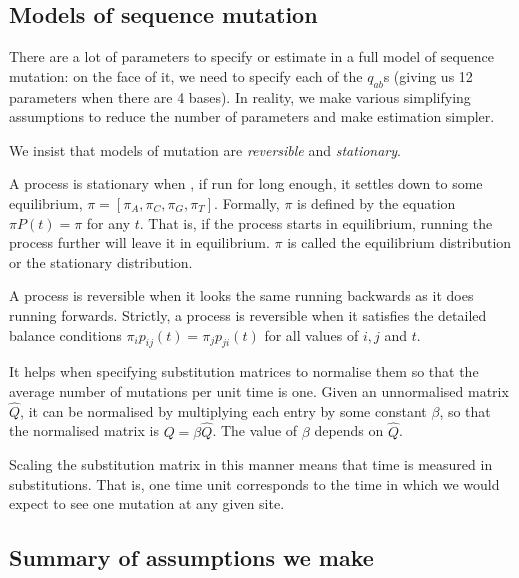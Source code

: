 \documentclass[11pt]{article}
\begin{document}
  
\subsection{Models of sequence mutation}


There are a lot of parameters to specify or estimate in a full model of sequence mutation: on the face of it, we need to specify each of the $q_{ab}$s (giving us 12 parameters when there are 4 bases).  In reality, we make various simplifying assumptions to reduce the number of parameters and make estimation simpler.


We insist that models of mutation are {\em reversible} and {\em stationary}.

A process is stationary when , if run for long enough, it settles down to some equilibrium,  $\pi = \left[ \pi_A, \pi_C, \pi_G, \pi_T \right]$.  Formally, $\pi$ is defined by the equation $\pi P(t) = \pi$ for any $t$.   That is, if the process starts in equilibrium, running the process further will leave it in equilibrium.  $\pi$ is called the equilibrium distribution or the stationary distribution.  

A  process is reversible when it looks the same running backwards as it does running forwards.    Strictly, a process is reversible when it satisfies the detailed balance conditions $\pi_i p_{ij}(t) = \pi_j p_{ji}(t)$ for all values of $i, j$ and $t$.

It helps when specifying substitution matrices to normalise them so that the average number of mutations per unit time is one. Given an unnormalised matrix $\hat Q$, it can be normalised by multiplying  each entry by some constant $\beta$, so that the normalised matrix is $Q = \beta \hat Q$.  The value of $\beta$ depends on $\hat Q$.

Scaling the substitution matrix in this manner means that time is measured in substitutions.  That is, one time unit corresponds to the time in which we would expect to see one mutation at any given site. 



\subsection*{Summary of assumptions we make}
\end{document}
